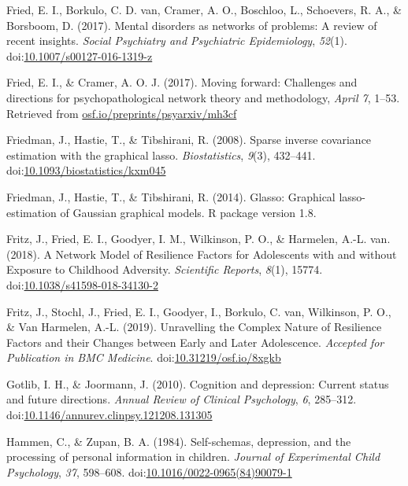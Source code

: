 \documentclass[man,floatsintext]{apa6}
\begin{document}
\leavevmode\hypertarget{ref-fried_mental_2017}{}%
Fried, E. I., Borkulo, C. D. van, Cramer, A. O., Boschloo, L., Schoevers, R. A., \& Borsboom, D. (2017). Mental disorders as networks of problems: A review of recent insights. \emph{Social Psychiatry and Psychiatric Epidemiology}, \emph{52}(1). doi:\href{https://doi.org/10.1007/s00127-016-1319-z}{10.1007/s00127-016-1319-z}

\leavevmode\hypertarget{ref-fried_moving_2017}{}%
Fried, E. I., \& Cramer, A. O. J. (2017). Moving forward: Challenges and directions for psychopathological network theory and methodology, \emph{April 7}, 1--53. Retrieved from \url{osf.io/preprints/psyarxiv/mh3cf}

\leavevmode\hypertarget{ref-friedman_sparse_2008}{}%
Friedman, J., Hastie, T., \& Tibshirani, R. (2008). Sparse inverse covariance estimation with the graphical lasso. \emph{Biostatistics}, \emph{9}(3), 432--441. doi:\href{https://doi.org/10.1093/biostatistics/kxm045}{10.1093/biostatistics/kxm045}

\leavevmode\hypertarget{ref-friedman_glasso:_2014}{}%
Friedman, J., Hastie, T., \& Tibshirani, R. (2014). Glasso: Graphical lasso- estimation of Gaussian graphical models. R package version 1.8.

\leavevmode\hypertarget{ref-fritz_network_2018}{}%
Fritz, J., Fried, E. I., Goodyer, I. M., Wilkinson, P. O., \& Harmelen, A.-L. van. (2018). A Network Model of Resilience Factors for Adolescents with and without Exposure to Childhood Adversity. \emph{Scientific Reports}, \emph{8}(1), 15774. doi:\href{https://doi.org/10.1038/s41598-018-34130-2}{10.1038/s41598-018-34130-2}

\leavevmode\hypertarget{ref-fritz_unravelling_2019}{}%
Fritz, J., Stochl, J., Fried, E. I., Goodyer, I., Borkulo, C. van, Wilkinson, P. O., \& Van Harmelen, A.-L. (2019). Unravelling the Complex Nature of Resilience Factors and their Changes between Early and Later Adolescence. \emph{Accepted for Publication in BMC Medicine}. doi:\href{https://doi.org/10.31219/osf.io/8xgkb}{10.31219/osf.io/8xgkb}

\leavevmode\hypertarget{ref-Gotlib2010}{}%
Gotlib, I. H., \& Joormann, J. (2010). Cognition and depression: Current status and future directions. \emph{Annual Review of Clinical Psychology}, \emph{6}, 285--312. doi:\href{https://doi.org/10.1146/annurev.clinpsy.121208.131305}{10.1146/annurev.clinpsy.121208.131305}

\leavevmode\hypertarget{ref-Hammen1984}{}%
Hammen, C., \& Zupan, B. A. (1984). Self-schemas, depression, and the processing of personal information in children. \emph{Journal of Experimental Child Psychology}, \emph{37}, 598--608. doi:\href{https://doi.org/10.1016/0022-0965(84)90079-1}{10.1016/0022-0965(84)90079-1}
\end{document}
